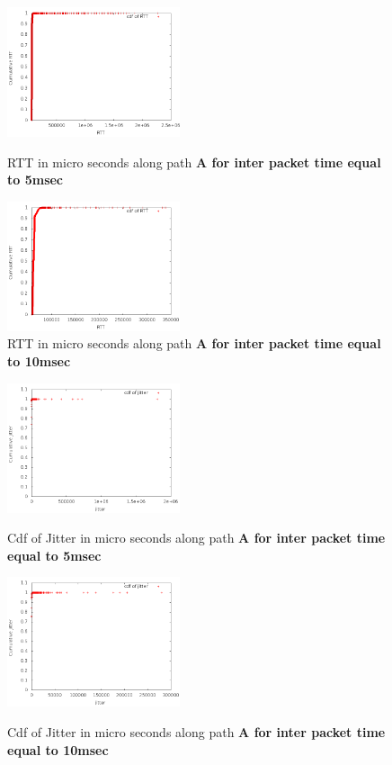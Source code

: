 \documentclass{sig-alternate-10pt} \usepackage{enumerate}
\begin{document}
{\begin{figure}
\begin{center}
    \includegraphics[width=2in]{figures/T2T/rtt_cdfplot_1_5ms.png}
    \caption{RTT in micro seconds along path \bf{A} for inter packet time equal to 5msec }
    \label{fig:tunnelrtt5} 

    \includegraphics[width=2in]{figures/T2T/rtt_cdfplot_1_10ms.png}
    \caption{RTT in micro seconds along path \bf{A} for inter packet time equal to 10msec}
    \label{fig:tunnelrtt10} 
    
  \end{center} 
\end{figure}

\begin{figure} 
  \begin{center}

\includegraphics[width=2in]{figures/T2T/jitter_cdfplot_1_5ms.png}
    \caption{Cdf of Jitter in micro seconds along path \bf{A} for inter packet time equal to 5msec}
    \label{fig:tunneljitter5} 
    \includegraphics[width=2in]{figures/T2T/jitter_cdfplot_1_10ms.png}
    \caption{Cdf of Jitter in micro seconds along path \bf{A} for inter packet time equal to 10msec }
    \label{fig:tunneljitter10}



\end{center}
\end{figure}}
\end{document}
